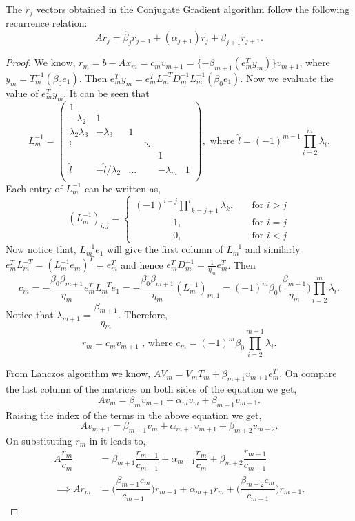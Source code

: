 \documentclass[10pt,a4paper]{article}
\begin{document}
\begin{proposition}
The $r_j$ vectors obtained in the Conjugate Gradient algorithm follow the following recurrence relation:
$$Ar_j=\hat{\beta}_jr_{j-1}+(\alpha_{j+1})r_j+\hat{\beta}_{j+1}r_{j+1}.$$ 
\end{proposition}

\begin{proof}
We know, $r_m=b-Ax_m=c_mv_{m+1}=\{-\beta_{m+1}(e^T_my_m)\}v_{m+1}$, where  $y_m=T^{-1}_m(\beta_0e_1).$ Then $e^T_my_m=e^T_mL^{-T}_mD^{-1}_mL^{-1}_m(\beta_0e_1)$. Now we evaluate the value of $e^T_my_m$. It can be seen that 
$$L^{-1}_m =
\left( \begin{array}{cccccc}
1 &  &  &  &  & \\
-\lambda_2 & 1 &  &  &  & \\
\lambda_2\lambda_3 & -\lambda_3 & 1 &  &  & \\
\vdots &  &  & \ddots &  & \\
 &  &  &  & 1 &  \\
\hat{l} & -\hat{l}/\lambda_2 & \hdots &  & -\lambda_m & 1 \\
\end{array} \right),\text{ where }\hat{l}=(-1)^{m-1}\prod^m_{i=2}\lambda_i.$$
Each entry of $L^{-1}_m$ can be written as,
\[   
(L^{-1}_m)_{i,j} = 
     \begin{cases}	
      (-1)^{i-j}\underset{k = j+1}{\overset{i}{\prod}}\lambda_k, &\quad\text{for }i>j\\
      \qquad \qquad 1, &\quad\text{for }i=j\\
      \qquad \qquad 0, &\quad\text{for }i<j
     \end{cases}
\]
Now notice that, $L^{-1}_me_1$ will give the first column of $L^{-1}_m$ and similarly $e^T_mL^{-T}_m = (L^{-1}_me_m)^T = e^T_m$ and hence $e^T_mD^{-1}_m=\frac{1}{\eta_m}e^T_m$. Then $$c_m=-\dfrac{\beta_0\beta_{m+1}}{\eta_m}e^T_mL^{-T}_me_1=-\dfrac{\beta_0\beta_{m+1}}{\eta_m}(L^{-1}_m)_{m,1}=(-1)^{m}\beta_0\bigg(\dfrac{\beta_{m+1}}{\eta_m}\bigg)\underset{i=2}{\overset{m}{\prod}}\lambda_i.$$
Notice that $\lambda_{m+1}=\dfrac{\beta_{m+1}}{\eta_m}$. Therefore, $$r_m = c_mv_{m+1}\text{ , where }c_m=(-1)^{m}\beta_0\underset{i=2}{\overset{m+1}{\prod}}\lambda_i.$$

From Lanczos algorithm we know, $AV_m=V_mT_m+\beta_{m+1}v_{m+1}e^T_m.$ On compare the last column of the matrices on both sides of the equation we get, 
$$Av_m=\beta_mv_{m-1}+\alpha_mv_m+\beta_{m+1}v_{m+1}.$$
Raising the index of the terms in the above equation we get,
$$Av_{m+1}=\beta_{m+1}v_{m}+\alpha_{m+1}v_{m+1}+\beta_{m+2}v_{m+2}.$$
On substituting $r_m$ in it leads to,
\begin{align*}
A\dfrac{r_m}{c_m}&=\beta_{m+1}\dfrac{r_{m-1}}{c_{m-1}}+\alpha_{m+1}\dfrac{r_{m}}{c_{m}}+\beta_{m+2}\dfrac{r_{m+1}}{c_{m+1}} \\
\implies Ar_m&=\bigg(\dfrac{\beta_{m+1}c_m}{c_{m-1}}\bigg)r_{m-1}+\alpha_{m+1}r_{m}+\bigg(\dfrac{\beta_{m+2}c_m}{c_{m+1}}\bigg)r_{m+1}.
\end{align*}
\end{proof}
\end{document}
